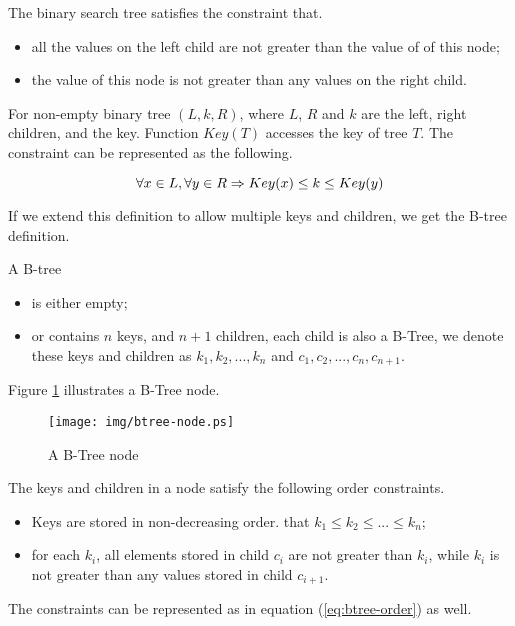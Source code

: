\documentclass[UTF8]{article}
\begin{document}
The binary search tree satisfies the constraint that.
\begin{itemize}
\item all the values on the left child are not greater than the value of of this node;
\item the value of this node is not greater than any values on the right child.
\end{itemize}

For non-empty binary tree $(L, k, R)$, where $L$, $R$ and $k$
are the left, right children, and the key. Function $Key(T)$ accesses
the key of tree $T$.
The constraint can be represented as the following.

\begin{equation}
\forall x \in L, \forall y \in R \\
\Rightarrow Key(x) \leq k \leq Key(y)
\end{equation}

If we extend this definition to allow multiple keys and children, we get the
B-tree definition.

A B-tree
\begin{itemize}
\item is either empty;
\item or contains $n$ keys, and $n+1$ children, each child is
also a B-Tree, we denote these keys and children as $k_1, k_2, ..., k_n$
and $c_1, c_2, ..., c_n, c_{n+1}$.
\end{itemize}

Figure \ref{fig:btree-node} illustrates a B-Tree node.

\begin{figure}[htbp]
  \centering
	\texttt{[image: img/btree-node.ps]}
  \caption{A B-Tree node} \label{fig:btree-node}
\end{figure}

The keys and children in a node satisfy the following order constraints.

\begin{itemize}
\item Keys are stored in non-decreasing order. that $k_1 \leq k_2 \leq ... \leq k_n$;
\item for each $k_i$, all elements stored in child $c_i$ are not greater
than $k_i$, while $k_i$ is not greater than any values stored in child $c_{i+1}$.
\end{itemize}

The constraints can be represented as in equation (\ref{eq:btree-order})
as well.
\end{document}
